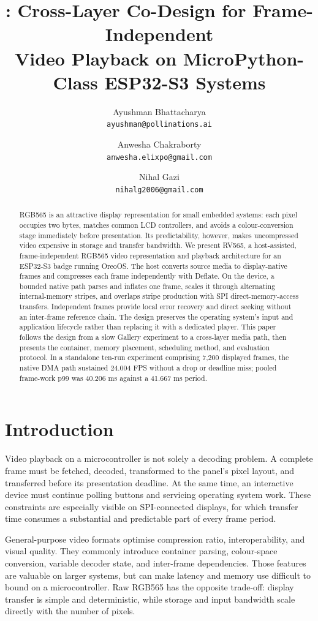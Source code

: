 \documentclass[11pt,twocolumn]{article}
\title{\system: Cross-Layer Co-Design for Frame-Independent\\
Video Playback on MicroPython-Class ESP32-S3 Systems}
\author{Ayushman Bhattacharya\\
\texttt{ayushman@pollinations.ai}
\and
Anwesha Chakraborty\\
\texttt{anwesha.elixpo@gmail.com}
\and
Nihal Gazi\\
\texttt{nihalg2006@gmail.com}}
\date{}
\newcommand{\system}{RV565}
\begin{document}
\maketitle

\begin{abstract}
RGB565 is an attractive display representation for small embedded systems:
each pixel occupies two bytes, matches common LCD controllers, and avoids a
colour-conversion stage immediately before presentation.  Its predictability,
however, makes uncompressed video expensive in storage and transfer bandwidth.
We present \system, a host-assisted, frame-independent RGB565 video
representation and playback architecture for an ESP32-S3 badge running
OreoOS.  The host converts source media to display-native frames and compresses
each frame independently with Deflate.  On the device, a bounded native path
parses and inflates one frame, scales it through alternating internal-memory
stripes, and overlaps stripe production with SPI direct-memory-access
transfers.  Independent frames provide local error recovery and direct seeking
without an inter-frame reference chain.  The design preserves the operating
system's input and application lifecycle rather than replacing it with a
dedicated player.  This paper follows the design from a slow Gallery
experiment to a cross-layer media path, then presents the container, memory
placement, scheduling method, and evaluation protocol.  In a standalone
ten-run experiment comprising 7,200 displayed frames, the native DMA path
sustained 24.004 FPS without a drop or deadline miss; pooled frame-work p99 was
40.206 ms against a 41.667 ms period.
\end{abstract}

\section{Introduction}

Video playback on a microcontroller is not solely a decoding problem.  A
complete frame must be fetched, decoded, transformed to the panel's pixel
layout, and transferred before its presentation deadline.  At the same time,
an interactive device must continue polling buttons and servicing operating
system work.  These constraints are especially visible on SPI-connected
displays, for which transfer time consumes a substantial and predictable part
of every frame period.

General-purpose video formats optimise compression ratio, interoperability,
and visual quality.  They commonly introduce container parsing, colour-space
conversion, variable decoder state, and inter-frame dependencies.  Those
features are valuable on larger systems, but can make latency and memory use
difficult to bound on a microcontroller.  Raw RGB565 has the opposite
trade-off: display transfer is simple and deterministic, while storage and
input bandwidth scale directly with the number of pixels.
\end{document}
